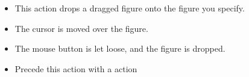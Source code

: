 

\begin{itemize}
\item This action drops a dragged figure onto the figure you specify.
\item The cursor is moved over the figure.
\item The mouse button is let loose, and the figure is dropped. 
\item Precede this action with a  action
\end{itemize}
